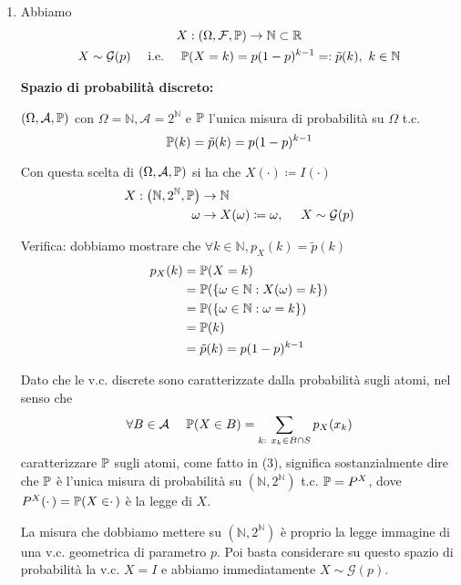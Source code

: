 \begin{enumerate}
\item Abbiamo
\begin{gather*}
X:( \Omega ,\mathcal{F} ,\mathbb{P})\rightarrow \mathbb{N} \subset \mathbb{R}\\
X\sim \mathcal{G}( p) \ \ \ \ \text{i.e.} \ \ \ \ \mathbb{P}( X=k) =p( 1-p)^{k-1} =:\tilde{p}( k) ,\ k\in \mathbb{N}
\end{gather*}

\textbf{Spazio di probabilità discreto:}

$( \Omega ,\mathcal{A} ,\mathbb{P})$ con $\Omega =\mathbb{N} ,\mathcal{A} =2^{\mathbb{N}}$ e $\mathbb{P}$ l'unica misura di probabilità su $\Omega $ t.c.\begin{equation}
\mathbb{P}( k) =\tilde{p}( k) =p( 1-p)^{k-1}
\end{equation}

Con questa scelta di $( \Omega ,\mathcal{A} ,\mathbb{P})$ si ha che $X( \cdotp ) \coloneqq I( \cdotp )$\begin{align*}
X:\left(\mathbb{N} ,2^{\mathbb{N}} ,\mathbb{P}\right) & \rightarrow \mathbb{N}\\
\omega  & \rightarrow X( \omega ) \coloneqq \omega ,\ \ \ \ X\sim \mathcal{G}( p)
\end{align*}

Verifica: dobbiamo mostrare che $\forall k\in \mathbb{N} ,p_{X}( k) =\tilde{p}( k)$\begin{align*}
p_{X}( k) & =\mathbb{P}( X=k)\\
 & =\mathbb{P}(\{\omega \in \mathbb{N} :X( \omega ) =k\})\\
 & =\mathbb{P}(\{\omega \in \mathbb{N} :\omega =k\})\\
 & =\mathbb{P}( k)\\
 & =\tilde{p}( k) =p( 1-p)^{k-1}
\end{align*}

\begin{oss}
Dato che le v.c. discrete sono caratterizzate dalla probabilità sugli atomi, nel senso che
\begin{equation*}
\forall B\in \mathcal{A} \ \ \ \ \mathbb{P}( X\in B) =\sum\limits _{k:\ x_{k} \in B\cap S} p_{X}( x_{k})
\end{equation*}
caratterizzare $\mathbb{P}$ sugli atomi, come fatto in (3), significa sostanzialmente dire che $\mathbb{P}$ è l'unica misura di probabilità su $\left(\mathbb{N} ,2^{\mathbb{N}}\right)$ t.c. $\mathbb{P} =P^{X}$, dove $P^{X}( \cdotp ) =\mathbb{P}( X\in \cdotp )$ è la legge di $X$.

La misura che dobbiamo mettere su $\left(\mathbb{N} ,2^{\mathbb{N}}\right)$ è proprio la legge immagine di una v.c. geometrica di parametro $p$. Poi basta considerare su questo spazio di probabilità la v.c. $X=I$ e abbiamo immediatamente $X\sim \mathcal{G}( p)$.
\end{oss}


\end{enumerate}
